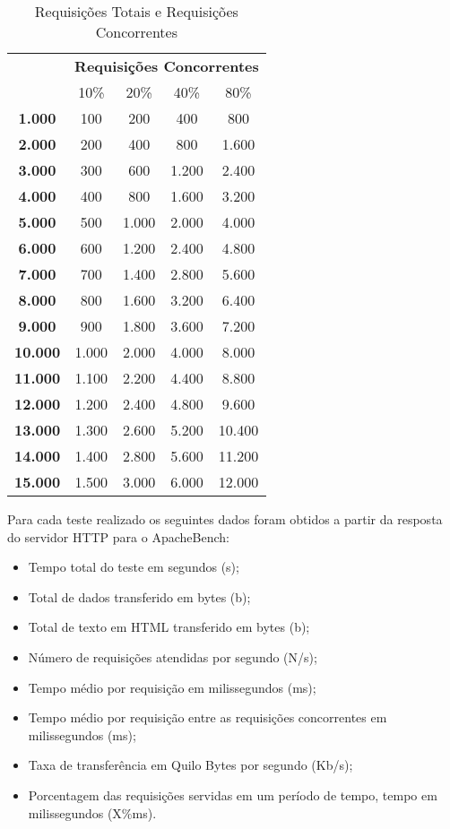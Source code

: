 \begin{table}[htb]
	\centering
\ABNTEXfontereduzida
\caption[Requisições Totais e Requisições Concorrentes]{Requisições Totais e Requisições Concorrentes}
\label{tab:requisicoes}
\begin{tabular}{|>{\bfseries}c|c|c|c|c|}
\hline
\multirow{2}{*}{Requisições Totais} & \multicolumn{4}{c|}{\textbf{Requisições 
Concorrentes}} \\ \cline{2-5}
& 10\%      & 20\%  & 40\%  & 80\%  \\ \hline
1.000  & 100   & 200   & 400   & 800   \\ \hline
2.000  & 200   & 400   & 800   & 1.600  \\ \hline
3.000  & 300   & 600   & 1.200 & 2.400  \\ \hline
4.000  & 400   & 800   & 1.600 & 3.200  \\ \hline
5.000  & 500   & 1.000 & 2.000 & 4.000  \\ \hline
6.000  & 600   & 1.200 & 2.400 & 4.800  \\ \hline
7.000  & 700   & 1.400 & 2.800 & 5.600  \\ \hline
8.000  & 800   & 1.600 & 3.200 & 6.400  \\ \hline
9.000  & 900   & 1.800 & 3.600 & 7.200  \\ \hline
10.000 & 1.000 & 2.000 & 4.000 & 8.000  \\ \hline
11.000 & 1.100 & 2.200 & 4.400 & 8.800  \\ \hline
12.000 & 1.200 & 2.400 & 4.800 & 9.600  \\ \hline
13.000 & 1.300 & 2.600 & 5.200 & 10.400 \\ \hline
14.000 & 1.400 & 2.800 & 5.600 & 11.200 \\ \hline
15.000 & 1.500 & 3.000 & 6.000 & 12.000 \\ \hline
\end{tabular}
\end{table}
Para cada teste realizado os seguintes dados foram obtidos a partir da resposta do servidor HTTP para o ApacheBench:
\begin{itemize}
	\item Tempo total do teste em segundos (s);
	\item Total de dados transferido em bytes (b);
	\item Total de texto em HTML transferido em bytes (b);
	\item Número de requisições atendidas por segundo (N/s);
	\item Tempo médio por requisição em milissegundos (ms);
	\item Tempo médio por requisição entre as requisições concorrentes em milissegundos (ms);
	\item Taxa de transferência em Quilo Bytes por segundo (Kb/s);
	\item Porcentagem das requisições servidas em um período de tempo, tempo em milissegundos (X\%ms).
\end{itemize}
